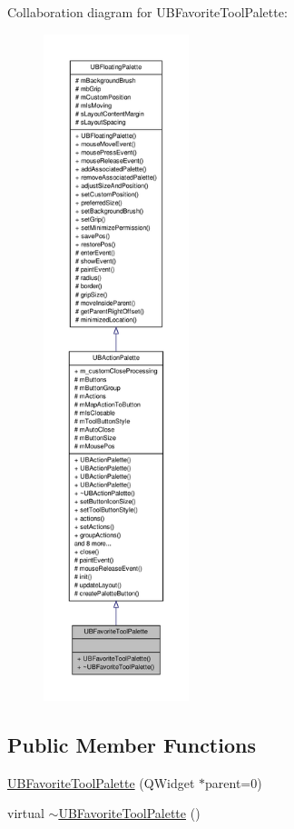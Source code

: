 Collaboration diagram for U\-B\-Favorite\-Tool\-Palette\-:
\nopagebreak
\begin{figure}[H]
\begin{center}
\leavevmode
\includegraphics[height=550pt]{d2/d90/class_u_b_favorite_tool_palette__coll__graph}
\end{center}
\end{figure}
\subsection*{Public Member Functions}
\begin{DoxyCompactItemize}
\item 
\hyperlink{class_u_b_favorite_tool_palette_a5c96e32fc43e9342cde947b25425516c}{U\-B\-Favorite\-Tool\-Palette} (Q\-Widget $\ast$parent=0)
\item 
virtual \hyperlink{class_u_b_favorite_tool_palette_ac5a7f0410488294c3aa065ac2f91827f}{$\sim$\-U\-B\-Favorite\-Tool\-Palette} ()
\end{DoxyCompactItemize}
